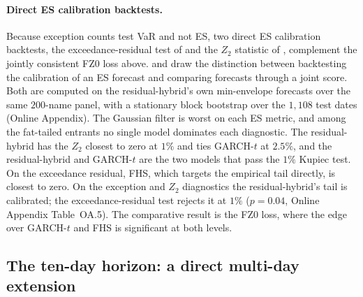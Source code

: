 \documentclass[11pt]{article}
\theoremstyle{remark}
\begin{document}
\paragraph{Direct ES calibration backtests.} Because exception counts test VaR and not ES,
two direct ES calibration backtests, the exceedance-residual test of \citet{mcneilfrey2000} and the $Z_2$ statistic of \citet{acerbi2014backtesting}, complement the jointly consistent FZ0 loss above. \citet{noldeziegel2017elicitability} and \citet{bayer2022esr} draw the
distinction between backtesting the calibration of an ES forecast and comparing
forecasts through a joint score. Both are computed on the residual-hybrid's own min-envelope forecasts over the same $200$-name panel, with a stationary block bootstrap over the $1{,}108$ test dates (Online Appendix). The Gaussian filter is worst on each ES metric, and among the fat-tailed entrants no single model dominates each diagnostic. The residual-hybrid has the $Z_2$ closest to zero at $1\%$ and ties GARCH-$t$ at $2.5\%$, and the residual-hybrid and GARCH-$t$ are the two models that pass the $1\%$ Kupiec test. On the exceedance residual, FHS, which targets the empirical tail directly, is closest to zero. On the exception and $Z_2$ diagnostics the residual-hybrid's tail is calibrated; the exceedance-residual test rejects it at $1\%$ ($p=0.04$, Online Appendix Table~OA.5). The comparative result is the FZ0 loss, where the edge over GARCH-$t$ and FHS is significant at both levels.

\subsection{The ten-day horizon: a direct multi-day extension}
\end{document}
